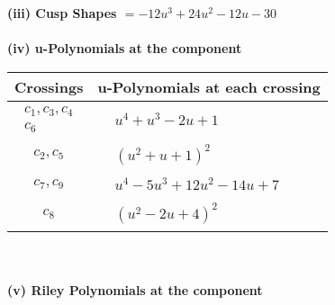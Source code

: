 \documentclass[1p]{elsarticle_modified}
\theoremstyle{definition}
\begin{document}
\flushleft \textbf{(iii) Cusp Shapes $= -12 u^3+24 u^2-12 u-30$}\\~\\
\newpage\renewcommand{\arraystretch}{1}
\flushleft \textbf{(iv) u-Polynomials at the component}\newline \\
\begin{tabular}{m{50pt}|m{274pt}}
Crossings & \hspace{64pt}u-Polynomials at each crossing \\
\hline $$\begin{aligned}c_{1},c_{3},c_{4}\\c_{6}\end{aligned}$$&$\begin{aligned}
&u^4+u^3-2 u+1
\end{aligned}$\\
\hline $$\begin{aligned}c_{2},c_{5}\end{aligned}$$&$\begin{aligned}
&(u^2+u+1)^2
\end{aligned}$\\
\hline $$\begin{aligned}c_{7},c_{9}\end{aligned}$$&$\begin{aligned}
&u^4-5 u^3+12 u^2-14 u+7
\end{aligned}$\\
\hline $$\begin{aligned}c_{8}\end{aligned}$$&$\begin{aligned}
&(u^2-2 u+4)^2
\end{aligned}$\\
\hline
\end{tabular}\\~\\
\newpage\renewcommand{\arraystretch}{1}
\flushleft \textbf{(v) Riley Polynomials at the component}\newline \\
\end{document}

